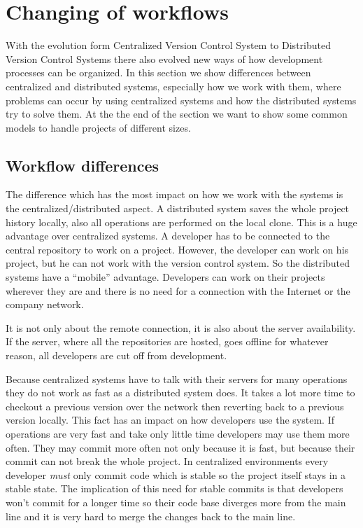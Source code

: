 \section{Changing of workflows} \label{changeofworkflows}

With the evolution form Centralized Version Control System to Distributed Version Control Systems there also 
evolved new ways of how development processes can be organized. In this section we show differences 
between centralized and distributed systems, especially how we work with them, where problems can occur by using 
centralized systems and how the distributed systems try to solve them. At the the end of the section we want 
to show some common models to handle projects of different sizes.

\subsection{Workflow differences}

The difference which has the most impact on how we work with the systems is the centralized/distributed aspect. 
A distributed system saves the whole project history locally, also all operations are performed on the local clone. 
This is a huge advantage over centralized systems. A developer has to be connected to the central 
repository to work on a project. However, the developer can work on his project, but 
he can not work with the version control system. So the distributed systems have a “mobile” advantage. 
Developers can work on their projects wherever they are and there is no need for a connection with the 
Internet or the company network.

It is not only about the remote connection, it is also about the server availability. If the server, where 
all the repositories are hosted, goes offline for whatever reason, all developers are cut off from development.

Because centralized systems have to talk with their servers for many operations they do not work as fast as 
a distributed system does. It takes a lot more time to checkout a previous version over the network 
then reverting back to a previous version locally. This fact has an impact on how developers use the system. 
If operations are very fast and take only little time developers may use them more often. They may commit 
more often not only because it is fast, but because their commit can not break the whole project. 
In centralized environments every developer \emph{must} only commit code which is stable so the project 
itself stays in a stable state. The implication of this need for stable commits is that developers won't 
commit for a longer time so their code base diverges more from the main line and it is very hard 
to merge the changes back to the main line.

